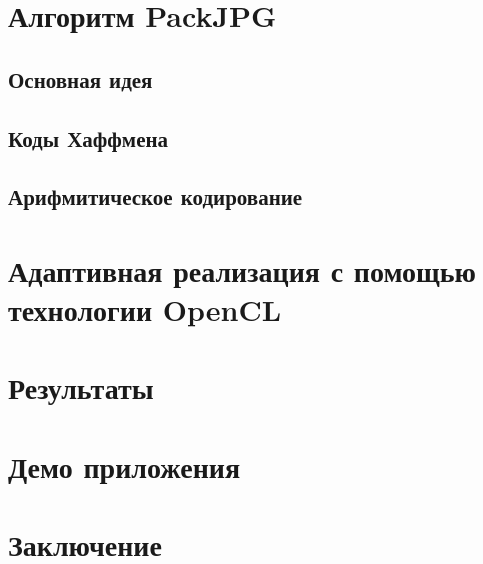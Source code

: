 \documentclass{matmex-diploma-custom}
\begin{document}
\section{Алгоритм PackJPG}
\subsection{Основная идея}
\subsection{Коды Хаффмена}
\subsection{Арифмитическое кодирование}
\section{Адаптивная реализация с помощью технологии OpenCL}
\section{Результаты}
\section{Демо приложения}

\section*{Заключение}



\end{document}

